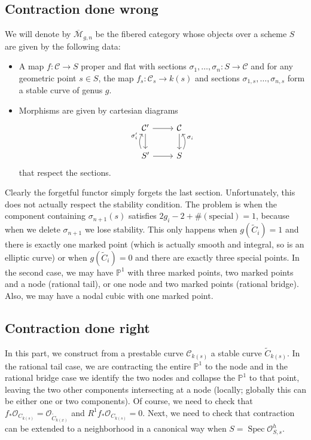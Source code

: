 \documentclass[leqno, openany]{memoir}
\theoremstyle{definition}
\theoremstyle{remark}
\theoremstyle{plain}
\theoremstyle{definition}
\theoremstyle{remark}
\renewcommand{\P}{\mathbb{P}}
\newcommand{\mc}[1]{\mathcal{#1}}
\newcommand{\ol}[1]{\overline{#1}}
\newcommand{\wt}[1]{\widetilde{#1}}
\DeclareMathOperator{\Spec}{Spec}
\begin{document}
\subsection{Contraction done wrong}%
\label{sub:contraction_done_wrong}

We will denote by $\ol{\mc{M}}_{g,n}$ be the fibered category whose objects over a scheme $S$ are given by the following data:
\begin{itemize}
    \item A map $f \colon \mc{C} \to S$ proper and flat with sections $\sigma_1, \ldots, \sigma_n \colon S \to \mc{C}$ and for any geometric point $s \in S$, the map $f_s \colon \mc{C}_s \to k(s)$ and sections $\sigma_{1,s}, \ldots, \sigma_{n,s}$ form a stable curve of genus $g$.
    \item Morphisms are given by cartesian diagrams
        \begin{equation*}
        \begin{tikzcd}
            \mc{C}' \ar{d} \ar{r} & \mc{C} \ar{d} \\
            S' \ar{r} \ar[bend left=30]{u}{\sigma_i'} & S \ar[bend right=30,swap]{u}{\sigma_i}
        \end{tikzcd}
        \end{equation*}
        that respect the sections.
\end{itemize}

Clearly the forgetful functor simply forgets the last section. Unfortunately, this does not actually respect the stability condition. The problem is when the component containing $\sigma_{n+1}(s)$ satisfies $2g_i - 2 + \#(\text{special}) = 1$, because when we delete $\sigma_{n+1}$ we lose stability. This only happens when $g(\wt{C}_i) = 1$ and there is exactly one marked point (which is actually smooth and integral, so is an elliptic curve) or when $g(\wt{C}_i) = 0$ and there are exactly three special points. In the second case, we may have $\P^1$ with three marked points, two marked points and a node (rational tail), or one node and two marked points (rational bridge). Also, we may have a nodal cubic with one marked point.

\subsection{Contraction done right}%
\label{sub:contraction_done_right}

In this part, we construct from a prestable curve $\mc{C}_{k(s)}$ a stable curve $\wt{C}_{k(s)}$. In the rational tail case, we are contracting the entire $\P^1$ to the node and in the rational bridge case we identify the two nodes and collapse the $\P^1$ to that point, leaving the two other components intersecting at a node (locally; globally this can be either one or two components). Of course, we need to check that $f_* \mc{O}_{C_{k(s)}} = \mc{O}_{\wt{C}_{k(x)}}$ and $R^1 f_* \mc{O}_{C_{k(s)}} = 0$. Next, we need to check that contraction can be extended to a neighborhood in a canonical way when $S = \Spec \mc{O}_{S,s}^h$.
\end{document}
